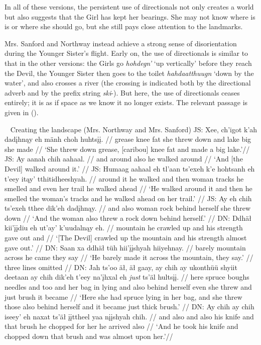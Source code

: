 In all of these versions, the persistent use of directionals not only creates a world but also suggests that the Girl has kept her bearings. She may not know where is is or where she should go, but she still pays close attention to the landmarks.

Mrs. Sanford and Northway instead achieve a strong sense of disorientation during the Younger Sister's flight. Early on, the use of directionals is similar to that in the other versions: the Girls go {\em hohdegn'} `up vertically' before they reach the Devil, the Younger Sister then goes to the toilet {\em hahdaatthuugn} `down by the water', and also crosses a river (the crossing is indicated both by the directional adverb and by the prefix string {\em ski}-). But here, the use of directionals ceases entirely; it is as if space as we know it no longer exists. The relevant passage is given in ().

\pex~ Creating the landscape (Mrs. Northway and Mrs. Sanford) 
\a
\begingl
\gla JS: Xee, ch'igot k'ah dadįhnąy eh mänh choh huhtsįį.  //
\glb { } grease knee fat {she threw down} and lake big {she made} //
\glft `She threw down grease, [caribou] knee fat and made a big lake.'//
\endgl
\a
\begingl
\gla JS: Ay aanah chih aahaal.  //
\glb { } and around also {he walked around} //
\glft `And [the Devil] walked around it.' //
\endgl
\a
\begingl
\gla JS: Humaag aahaal eh tl'aan ts'exeh k'e hohtsanh eh t'eey itąy' tthitidheeshyah.  //
\glb { } {around it} {he walked} and then woman tracks {he smelled} and even {her trail} {he walked ahead} //
\glft `He walked around it and then he smelled the woman's tracks and he walked ahead on her trail.' //
\endgl
\a
\begingl
\gla JS: {Ay eh} chih ts'exeh tthee dik'eh dadįhnąy.  //
\glb { } and also woman rock {behind herself} {she threw down} //
\glft `And the woman also threw a rock down behind herself.' //
\endgl
\a
\begingl
\gla DN: Ddhäł kii'įįdiu eh ut'ay' k'uudalnąy eh.  //
\glb { } mountain {he crawled up} and {his strength} {gave out} and //
\glft `[The Devil] crawled up the mountain and his strength almost gave out.' //
\endgl
\a
\begingl
\gla DN: {Saan xa} ddhäł tüh hii'įįshyah hiiyehnay.  //
\glb { } barely mountain across {he came} {they say} //
\glft `He barely made it across the mountain, they say.' //
\endgl
\a
\begingl
\gla three lines omitted //
\endgl
\a
\begingl
\gla DN: Jah ts'oo äł, {äł gaay}, ay chih ay ukonthüü shyiit deetaan ay chih dik'eh t'eey na'įhxal eh {\em just} ts'äl hultsįį.  //
\glb { } here spruce boughs needles and too and {her bag} in lying and also {behind herself} even {she threw} and just brush {it became} //
\glft `Here she had spruce lying in her bag, and she threw those also behind herself and it became just thick brush.' //
\endgl
\a
\begingl
\gla DN: Ay chih ay chih iseey' eh naxat ts'äł įįttheel yaa nįįshyah chih.  //
\glb { } and also and also {his knife} and that brush {he chopped} {for her} {he arrived} also //
\glft `And he took his knife and chopped down that brush and was almost upon her.'//
\endgl
\xe

